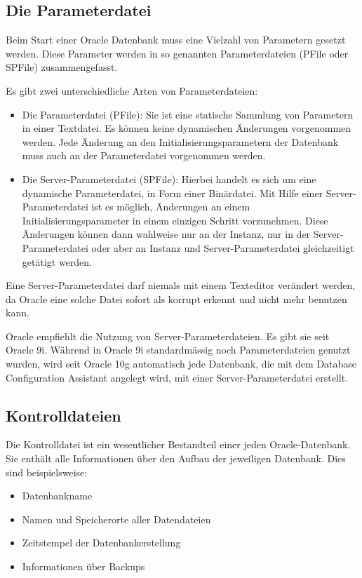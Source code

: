         \subsection{Die Parameterdatei}
          Beim Start einer Oracle Datenbank muss eine Vielzahl von Parametern gesetzt werden. Diese Parameter werden in so genannten Parameterdateien (PFile oder SPFile) zusammengefasst.

          Es gibt zwei unterschiedliche Arten von Parameterdateien:

          \begin{itemize}
            \item Die Parameterdatei (PFile): Sie ist eine statische Sammlung von Parametern in einer Textdatei. Es k\"onnen keine dynamischen \"Anderungen vorgenommen werden. Jede \"Anderung an den Initialisierungsparametern der Datenbank muss auch an der Parameterdatei vorgenommen werden.
            \item Die Server-Parameterdatei (SPFile): Hierbei handelt es sich um eine dynamische Parameterdatei, in Form einer Bin\"ardatei. Mit Hilfe einer Server-Parameterdatei ist es m\"oglich, \"Anderungen an einem Initialisierungsparameter in einem einzigen Schritt vorzunehmen. Diese \"Anderungen k\"onnen dann wahlweise nur an der Instanz, nur in der Server-Parameterdatei oder aber an Instanz und Server-Parameterdatei gleichzeitigt get\"atigt werden.
          \end{itemize}

          \begin{merke}
            Eine Server-Parameterdatei darf niemals mit einem Texteditor ver\"andert werden, da Oracle eine solche Datei sofort als korrupt erkennt und nicht mehr benutzen kann.
          \end{merke}

          Oracle empfiehlt die Nutzung von Server-Parameterdateien. Es gibt sie seit Oracle 9i. W\"ahrend in Oracle 9i standardm\"assig noch Parameterdateien genutzt wurden, wird seit Oracle 10g automatisch jede Datenbank, die mit dem Database Configuration Assistant angelegt wird, mit einer Server-Parameterdatei erstellt.
       \subsection{Kontrolldateien}
        Die Kontrolldatei ist ein wesentlicher Bestandteil einer jeden Oracle-Datenbank. Sie enth\"alt alle  Informationen \"uber den Aufbau der jeweiligen Datenbank. Dies sind beispielsweise:
          \begin{itemize}
            \item Datenbankname
            \item Namen und Speicherorte aller Datendateien
            \item Zeitstempel der Datenbankerstellung
            \item Informationen \"uber Backups
          \end{itemize}


